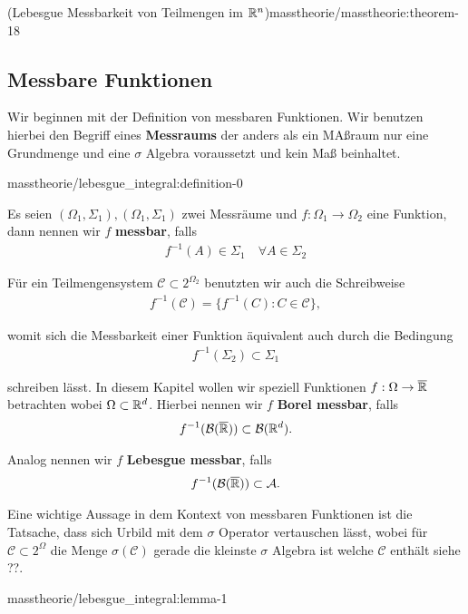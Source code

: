 \begin{theorem}{(Lebesgue Messbarkeit von Teilmengen im \protect\(\mathbb{R}^n\protect\))}{masstheorie/masstheorie:theorem-18}
\subsection{Messbare Funktionen}
\label{\detokenize{masstheorie/lebesgue_integral:messbare-funktionen}}
\par
Wir beginnen mit der Definition von messbaren Funktionen. Wir benutzen hierbei den Begriff eines \textbf{Messraums} der anders als ein MAßraum nur eine Grundmenge und eine \(\sigma\) Algebra voraussetzt und kein Maß beinhaltet.
\begin{definition}{}{masstheorie/lebesgue_integral:definition-0}



\par
Es seien \((\Omega_1,\Sigma_1), (\Omega_1,\Sigma_1)\) zwei Messräume und \(f:\Omega_1\to\Omega_2\) eine Funktion, dann nennen wir \(f\) \textbf{messbar}, falls
\begin{align*}
f^{-1}(A)\in\Sigma_1\quad\forall A\in\Sigma_2
\end{align*}\end{definition}

\par
Für ein Teilmengensystem \(\mathcal{C}\subset 2^{\Omega_2}\) benutzten wir auch die Schreibweise
\begin{align*}
f^{-1}(\mathcal{C}) = \{ f^{-1}(C): C\in\mathcal{C}\},
\end{align*}
\par
womit sich die Messbarkeit einer Funktion äquivalent auch durch die Bedingung
\begin{align*}
f^{-1}(\Sigma_2)\subset\Sigma_1
\end{align*}
\par
schreiben lässt. In diesem Kapitel wollen wir speziell Funktionen \(f:\Omega\to\overline{\mathbb{R}}\) betrachten wobei \(\Omega\subset\mathbb{R}^d\). Hierbei nennen wir \(f\) \textbf{Borel messbar}, falls
\begin{align*}
f^{-1}(\mathcal{B}(\overline{\mathbb{R}}))\subset \mathcal{B}(\mathbb{R}^d).
\end{align*}
\par
Analog nennen wir \(f\) \textbf{Lebesgue messbar}, falls
\begin{align*}
f^{-1}(\mathcal{B}(\overline{\mathbb{R}}))\subset \mathcal{A}.
\end{align*}
\par
Eine wichtige Aussage in dem Kontext von messbaren Funktionen ist die Tatsache, dass sich Urbild mit dem \(\sigma\) Operator vertauschen lässt, wobei für \(\mathcal{C}\subset 2^\Omega\) die Menge \(\sigma(\mathcal{C})\) gerade die kleinste \(\sigma\) Algebra ist welche \(\mathcal{C}\) enthält siehe ??.
\begin{lemma}{}{masstheorie/lebesgue_integral:lemma-1}




\end{lemma}
\end{theorem}
